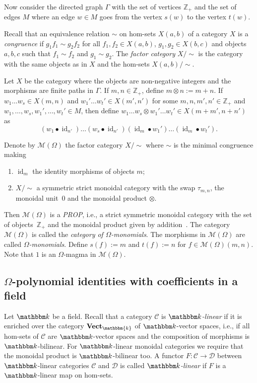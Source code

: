\documentclass[12pt, reqno, a4paper]{amsart}
\theoremstyle{plain}
\theoremstyle{remark}
\theoremstyle{definition}
\numberwithin{equation}{section}
\DeclareMathOperator{\id}{id}
\begin{document}
Now consider the directed graph $\Gamma$ with the set of vertices $\mathbb Z_+$ and the set of edges $M$
where an edge $w \in M$ goes from the vertex $s(w)$ to the vertex $t(w)$.

Recall that an equivalence relation $\sim$ on hom-sets $X (a,b)$ of a category $X$ is a \textit{congruence} if
$g_1 f_1 \sim g_2 f_2$ for all $f_1, f_2 \in X (a,b)$, $g_1, g_2 \in X (b,c)$
and objects $a,b,c$ such that $f_1 \sim f_2$ and $g_1 \sim g_2$.
The \textit{factor category} $X/{\sim}$ is the category with the same objects as in $X$ and the hom-sets $X (a,b)/{\sim}$.

Let $X$ be the category where the objects are non-negative integers and the morphisms are finite paths
in $\Gamma$.
If $m,n \in \mathbb Z_+$, define $m \otimes n :=  m+n$.
 If $w_1 \ldots w_s \in X(m,n)$ and  $w_1'\ldots w_t' \in X(m',n')$
  for some $m,n,m',n' \in \mathbb Z_+$ and $w_1, \ldots, w_s, w_1', \ldots, w_t' \in M$, then define 
$w_1 \ldots w_s \otimes w_1' \ldots w_t' \in X(m+m',n+n')$ 
as $$(w_1 \bullet  \id_{n'}) \dots (w_s \bullet  \id_{n'})
 (\id_m \bullet  w_1') \ldots (\id_m \bullet  w_t').$$

Denote by $\mathcal M(\Omega)$ the factor category $X/{\sim}$ where  $\sim$ is the minimal congruence making 
\begin{enumerate}
\item $\id_m$ the identity morphisms of objects $m$;
\item $X/{\sim}$ a symmetric strict monoidal category with the swap $\tau_{m,n}$,
the monoidal unit~$0$ and the monoidal product $\otimes$.
\end{enumerate}

Then $\mathcal M(\Omega)$ is a \textit{PROP}, i.e., a strict symmetric monoidal category with the set of objects~$\mathbb Z_+$ and
the monoidal product given by addition~\cite[Section~24]{MacLane65}. The category~$\mathcal M(\Omega)$ is called the \textit{category of $\Omega$-monomials}.
The morphisms in $\mathcal M(\Omega)$ are called \textit{$\Omega$-monomials}.
 Define $s(f):= m$ and $t(f):= n$ for $f \in \mathcal M(\Omega)(m,n)$. Note that $1$ is an $\Omega$-magma in $\mathcal M(\Omega)$.
 
 
 \subsection{$\Omega$-polynomial identities with coefficients in a field}
 
 Let $\mathbbm k$ be a field. Recall that a category $\mathcal C$ is \textit{$\mathbbm k$-linear} if it is enriched over
 the category $\mathbf{Vect}_\mathbbm{k}$ of $\mathbbm k$-vector spaces, i.e., if all hom-sets of $\mathcal C$ are $\mathbbm k$-vector spaces
 and the composition of morphisms is $\mathbbm k$-bilinear. For $\mathbbm k$-linear monoidal categories we require that the monoidal product is $\mathbbm k$-bilinear too. A functor $F \colon \mathcal C \to \mathcal D$ between $\mathbbm k$-linear categories $\mathcal C$ and $\mathcal D$
 is called \textit{$\mathbbm k$-linear} if $F$ is a $\mathbbm k$-linear map on hom-sets.
  
\end{document}
